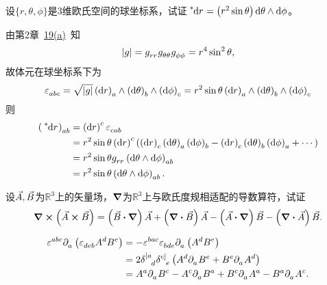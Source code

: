 \begin{xiti}
	\item 设$\{r,\theta, \phi \} $是3维欧氏空间的球坐标系，试证$\tensor[^*]{\dd{r}}{} = \left(r^2 \sin\theta \right) \dd{\theta} \wedge \dd{\phi} $。
	
	\begin{zm}
		由第2章~\hyperlink{2.19a}{19(a)}~知
		\begin{displaymath}
		\abs{g} = \tensor{g}{_r_r} \tensor{g}{_{\theta\theta}} \tensor{g}{_\phi_\phi} = r^4 \sin^2 \theta,
		\end{displaymath}
		故体元在球坐标系下为
		\begin{displaymath}
		\tensor{\varepsilon}{_a_b_c} = \sqrt{\abs{g}} \tensor{\left(\dd{r}\right)}{_a} \wedge \tensor{\left(\dd{\theta}\right)}{_b} \wedge \tensor{\left(\dd{\phi}\right)}{_c} = r^2 \sin\theta \tensor{\left(\dd{r}\right)}{_a} \wedge \tensor{\left(\dd{\theta}\right)}{_b} \wedge \tensor{\left(\dd{\phi}\right)}{_c}
		\end{displaymath}
		则
		\begin{align*}
		\tensor{\left(\tensor[^*]{\dd{r}}{}\right)}{_a_b} &= \tensor{\left(\dd{r}\right)}{^c} \tensor{\varepsilon}{_c_a_b}\\
		&= r^2 \sin\theta \tensor{\left(\dd{r}\right)}{^c} \left( \tensor{\left(\dd{r}\right)}{_c} \tensor{\left(\dd{\theta}\right)}{_a} \tensor{\left(\dd{\phi}\right)}{_b} - \tensor{\left(\dd{r}\right)}{_c} \tensor{\left(\dd{\theta}\right)}{_b} \tensor{\left(\dd{\phi}\right)}{_a} + \cdots \right)\\
		&= r^2 \sin\theta \tensor{g}{_r_r} \tensor{\left(\dd{\theta}\wedge\dd{\phi}\right)}{_a_b}\\
		&= r^2 \sin\theta \tensor{\left(\dd{\theta}\wedge\dd{\phi}\right)}{_a_b}.
		\end{align*}
	\end{zm}
	
	\item 设$\vec{A},\vec{B} $为$\mathbb{R}^3 $上的矢量场，$\grad $为$\mathbb{R}^3$上与欧氏度规相适配的导数算符，试证\[ \curl(\myvec{A}\cp\myvec{B}) = \left( \myvec{B} \vdot \grad \right) \myvec{A} + \left( \div{\myvec{B}} \right) \myvec{A} - \left( \myvec{A} \vdot \grad \right) \myvec{B} - \left( \div{\myvec{A}} \right) \myvec{B}. \]
	
	\begin{zm}
		\begin{align*}
		\tensor{\varepsilon}{^a^b^c} \Partial{a} \left( \tensor{\varepsilon}{_d_e_b} \tensor{A}{^d} \tensor{B}{^e} \right) &= -\tensor{\varepsilon}{^b^a^c} \tensor{\varepsilon}{_b_d_e} \Partial{a} \left(  \tensor{A}{^d} \tensor{B}{^e} \right)\\
		&= 2 \tensor{\delta}{^{[a}_d} \tensor{\delta}{^{c]}_e} \left( \tensor{A}{^d} \Partial{a} \tensor{B}{^e} + \tensor{B}{^e} \Partial{a} \tensor{A}{^d} \right)\\
		&= \tensor{A}{^a} \Partial{a} \tensor{B}{^c} - \tensor{A}{^c} \Partial{a} \tensor{B}{^a} + \tensor{B}{^c} \Partial{a} \tensor{A}{^a} - \tensor{B}{^a} \Partial{a} \tensor{A}{^c}.
		\end{align*}
	\end{zm}
	

\end{xiti}
